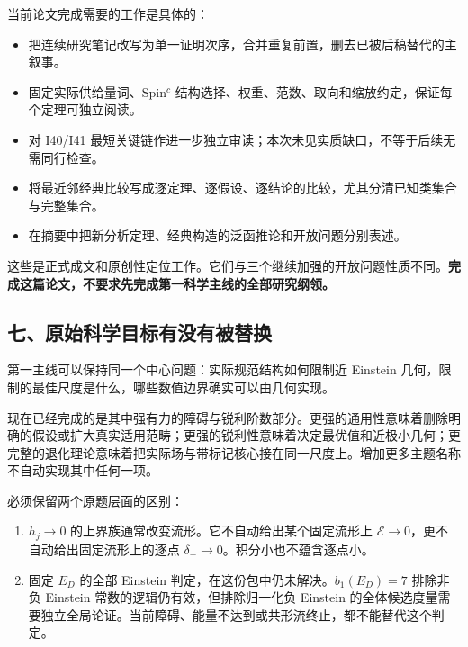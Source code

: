 \documentclass[
  10pt,
]{article}
\providecommand{\tightlist}{%
  \setlength{\itemsep}{0pt}\setlength{\parskip}{0pt}}
\begin{document}
当前论文完成需要的工作是具体的：

\begin{itemize}
\tightlist
\item
  把连续研究笔记改写为单一证明次序，合并重复前置，删去已被后稿替代的主叙事。
\item
  固定实际供给量词、Spin\(^c\)
  结构选择、权重、范数、取向和缩放约定，保证每个定理可独立阅读。
\item
  对 I40/I41
  最短关键链作进一步独立审读；本次未见实质缺口，不等于后续无需同行检查。
\item
  将最近邻经典比较写成逐定理、逐假设、逐结论的比较，尤其分清已知类集合与完整集合。
\item
  在摘要中把新分析定理、经典构造的泛函推论和开放问题分别表述。
\end{itemize}

这些是正式成文和原创性定位工作。它们与三个继续加强的开放问题性质不同。\textbf{完成这篇论文，不要求先完成第一科学主线的全部研究纲领。}

\hypertarget{ux4e03ux539fux59cbux79d1ux5b66ux76eeux6807ux6709ux6ca1ux6709ux88abux66ffux6362}{%
\subsection{七、原始科学目标有没有被替换}\label{ux4e03ux539fux59cbux79d1ux5b66ux76eeux6807ux6709ux6ca1ux6709ux88abux66ffux6362}}

第一主线可以保持同一个中心问题：实际规范结构如何限制近 Einstein
几何，限制的最佳尺度是什么，哪些数值边界确实可以由几何实现。

现在已经完成的是其中强有力的障碍与锐利阶数部分。更强的通用性意味着删除明确的假设或扩大真实适用范畴；更强的锐利性意味着决定最优值和近极小几何；更完整的退化理论意味着把实际场与带标记核心接在同一尺度上。增加更多主题名称不自动实现其中任何一项。

必须保留两个原题层面的区别：

\begin{enumerate}
\def\labelenumi{\arabic{enumi}.}
\tightlist
\item
  \(h_j\to0\) 的上界族通常改变流形。它不自动给出某个固定流形上
  \(\mathcal E\to0\)，更不自动给出固定流形上的逐点
  \(\delta_-\to0\)。积分小也不蕴含逐点小。
\item
  固定 \(E_D\) 的全部 Einstein 判定，在这份包中仍未解决。\(b_1(E_D)=7\)
  排除非负 Einstein 常数的逻辑仍有效，但排除归一化负 Einstein
  的全体候选度量需要独立全局论证。当前障碍、能量不达到或共形流终止，都不能替代这个判定。
\end{enumerate}
\end{document}
